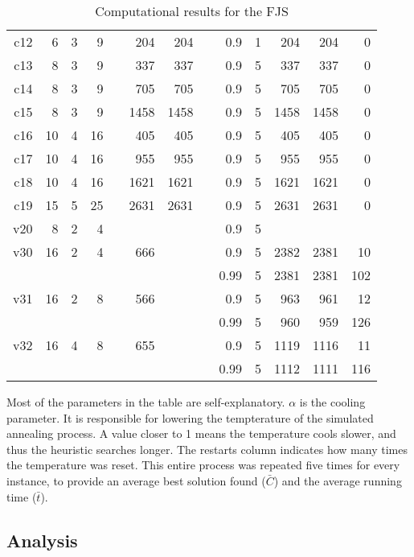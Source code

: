 \documentclass[a4paper,10pt]{article}
\begin{document}
\begin{table}[h]
\begin{tabular}{@{\bfseries}rrrrrrrrrrrrr}
	c12  &  6 &  3 &  9 &&  204 &  204 &&    0.9 & 1 &  204 &  204 &    0 \\
	c13  &  8 &  3 &  9 &&  337 &  337 &&    0.9 & 5 &  337 &  337 &    0 \\
	c14  &  8 &  3 &  9 &&  705 &  705 &&    0.9 & 5 &  705 &  705 &    0 \\
	c15  &  8 &  3 &  9 && 1458 & 1458 &&    0.9 & 5 & 1458 & 1458 &    0 \\
	c16  & 10 &  4 & 16 &&  405 &  405 &&    0.9 & 5 &  405 &  405 &    0 \\
	c17  & 10 &  4 & 16 &&  955 &  955 &&    0.9 & 5 &  955 &  955 &    0 \\
	c18  & 10 &  4 & 16 && 1621 & 1621 &&    0.9 & 5 & 1621 & 1621 &    0 \\
	c19  & 15 &  5 & 25 && 2631 & 2631 &&    0.9 & 5 & 2631 & 2631 &    0 \\[2ex]
	v20  &  8 &  2 &  4 &&      &      &&    0.9 & 5 &      &      &      \\
	v30  & 16 &  2 &  4 &&  666 &      &&    0.9 & 5 & 2382 & 2381 &   10 \\
	     &    &    &    &&      &      &&   0.99 & 5 & 2381 & 2381 &  102 \\
	v31  & 16 &  2 &  8 &&  566 &      &&    0.9 & 5 &  963 &  961 &   12 \\
	     &    &    &    &&      &      &&   0.99 & 5 &  960 &  959 &  126 \\
	v32  & 16 &  4 &  8 &&  655 &      &&    0.9 & 5 & 1119 & 1116 &   11 \\
	     &    &    &    &&      &      &&   0.99 & 5 & 1112 & 1111 &  116 \\
	\bottomrule
\end{tabular}
\caption{Computational results for the FJS}
\label{table:fjs}
\end{table}

Most of the parameters in the table are self-explanatory. $\alpha$ is the cooling parameter. It is responsible for lowering the tempterature of the simulated annealing process. A value closer to 1 means the temperature cools slower, and thus the heuristic searches longer. The restarts column indicates how many times the temperature was reset. This entire process was repeated five times for every instance, to provide an average best solution found ($\bar{C}$) and the average running time ($\bar{t}$).

\subsection{Analysis}
\end{document}
